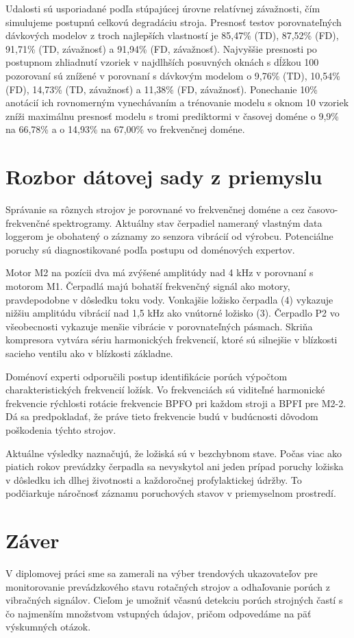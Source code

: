Udalosti sú usporiadané podľa stúpajúcej úrovne relatívnej závažnosti, čím simulujeme postupnú celkovú degradáciu stroja. Presnosť testov porovnateľných dávkových modelov z troch najlepších vlastností je 85,47\% (TD), 87,52\% (FD), 91,71\% (TD, závažnosť) a 91,94\% (FD, závažnosť). Najvyššie presnosti po postupnom zhliadnutí vzoriek v najdlhších posuvných oknách s dĺžkou 100 pozorovaní sú znížené v porovnaní s dávkovým modelom o 9,76\% (TD), 10,54\% (FD), 14,73\% (TD, závažnosť) a 11,38\% (FD, závažnosť). Ponechanie 10\% anotácií ich rovnomerným vynechávaním a trénovanie modelu s oknom 10 vzoriek zníži maximálnu presnosť modelu s tromi prediktormi v časovej doméne o 9,9\% na 66,78\% a o 14,93\% na 67,00\% vo frekvenčnej doméne.

\section{Rozbor dátovej sady z priemyslu}
Správanie sa rôznych strojov je porovnané vo frekvenčnej doméne a cez časovo-frekvenčné spektrogramy. Aktuálny stav čerpadiel nameraný vlastným data loggerom je obohatený o záznamy zo senzora vibrácií od výrobcu. Potenciálne poruchy sú diagnostikované podľa postupu od doménových expertov. 

Motor M2 na pozícii dva má zvýšené amplitúdy nad 4 kHz v porovnaní s motorom M1. Čerpadlá majú bohatší frekvenčný signál ako motory, pravdepodobne v dôsledku toku vody. Vonkajšie ložisko čerpadla (4) vykazuje nižšiu amplitúdu vibrácií nad 1,5 kHz ako vnútorné ložisko (3). Čerpadlo P2 vo všeobecnosti vykazuje menšie vibrácie v porovnateľných pásmach. Skriňa kompresora vytvára sériu harmonických frekvencií, ktoré sú silnejšie v blízkosti sacieho ventilu ako v blízkosti základne.

Doménoví experti odporučili postup identifikácie porúch výpočtom charakteristických frekvencií ložísk. Vo frekvenciách sú viditeľné harmonické frekvencie rýchlosti rotácie frekvencie BPFO pri každom stroji a BPFI pre M2-2. Dá sa predpokladať, že práve tieto frekvencie budú v budúcnosti dôvodom poškodenia týchto strojov.

Aktuálne výsledky naznačujú, že ložiská sú v bezchybnom stave. Počas viac ako piatich rokov prevádzky čerpadla sa nevyskytol ani jeden prípad poruchy ložiska v dôsledku ich dlhej životnosti a každoročnej profylaktickej údržby. To podčiarkuje náročnosť záznamu poruchových stavov v priemyselnom prostredí. 

\section{Záver}
V diplomovej práci sme sa zamerali na výber trendových ukazovateľov pre monitorovanie prevádzkového stavu rotačných strojov a odhaľovanie porúch z vibračných signálov.  
Cieľom je umožniť včasnú detekciu porúch strojných častí s čo najmenším množstvom vstupných údajov, pričom odpovedáme na päť výskumných otázok.

